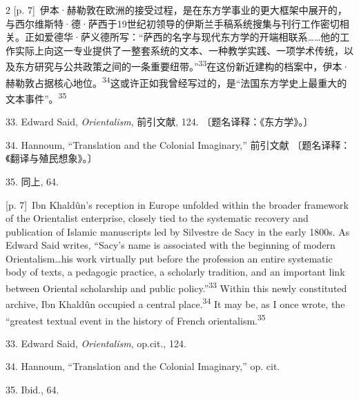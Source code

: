 \documentclass[10pt,a4paper]{article}
\begin{document}
\begin{paracol}{2}
{\scriptsize\color{gray} [p. 7]}\ 伊本·赫勒敦在欧洲的接受过程，是在东方学事业的更大框架中展开的，与西尔维斯特·德·萨西于19世纪初领导的伊斯兰手稿系统搜集与刊行工作密切相关。正如爱德华·萨义德所写：“萨西的名字与现代东方学的开端相联系……他的工作实际上向这一专业提供了一整套系统的文本、一种教学实践、一项学术传统，以及东方研究与公共政策之间的一条重要纽带。”\nobreak\textsuperscript{33}在这份新近建构的档案中，伊本·赫勒敦占据核心地\mbox{位。\textsuperscript{34}}这或许正如我曾经写过的，是“法国东方学史上最重大的文本事件”。\nobreak\textsuperscript{35}\par{\small 33. Edward Said, \textit{Orientalism}, 前引文献, 124. 〔题名译释：《东方学》。〕\par}{\small 34. Hannoum, “Translation and the Colonial Imaginary,” 前引文献 〔题名译释：《翻译与殖民想象》。〕\par}{\small 35. 同上, 64.\par}
\switchcolumn
{\scriptsize\color{gray} [p. 7]}\ Ibn Khaldûn’s reception in Europe unfolded within the broader framework of the Orientalist enterprise, closely tied to the systematic recovery and publication of Islamic manuscripts led by Silvestre de Sacy in the early 1800s. As Edward Said writes, “Sacy’s name is associated with the beginning of modern Orientalism…his work virtually put before the profession an entire systematic body of texts, a pedagogic practice, a scholarly tradition, and an important link between Oriental scholarship and public policy.”\nobreak\textsuperscript{33} Within this newly constituted archive, Ibn Khaldûn occupied a central place.\nobreak\textsuperscript{34} It may be, as I once wrote, the “greatest textual event in the history of French orientalism.\nobreak\textsuperscript{35}\par{\small 33. Edward Said, \textit{Orientalism}, op.cit., 124.\par}{\small 34. Hannoum, “Translation and the Colonial Imaginary,” op. cit.\par}{\small 35. Ibid., 64.\par}
\switchcolumn*

\end{paracol}
\end{document}
